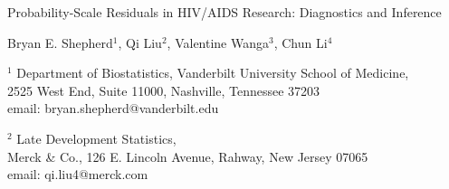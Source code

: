 \documentclass[12pt, usenatbib]{article}
\begin{document}
\begin{center}
\large 

\vspace{1in}

Probability-Scale Residuals in HIV/AIDS Research: Diagnostics and Inference

\normalsize
\bigskip

\bigskip
\bigskip
\bigskip
\bigskip
\bigskip

Bryan E. Shepherd$^1$,  Qi Liu$^2$, Valentine Wanga$^3$, Chun Li$^4$

\bigskip
\bigskip
\bigskip
\bigskip
\bigskip
\bigskip
\bigskip
\bigskip




$^1$ Department of Biostatistics, Vanderbilt University School of Medicine, \\ 2525 West End, Suite 11000, Nashville, Tennessee 37203  \\ email: bryan.shepherd@vanderbilt.edu

\bigskip
\bigskip

$^2$ Late Development Statistics, \\Merck \& Co., 126 E. Lincoln Avenue, Rahway, New Jersey 07065 \\ email: qi.liu4@merck.com


\end{center}
\end{document}
